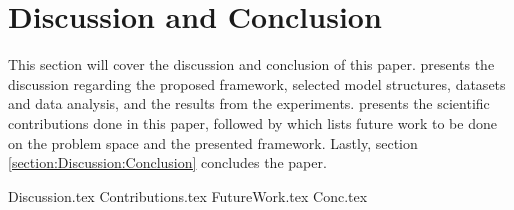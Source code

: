 \chapter{Discussion and Conclusion}

\label{section:Discussion}

This section will cover the discussion and conclusion of this paper.
 presents the discussion regarding the proposed framework,
selected model structures, datasets and data analysis, and the results from the experiments.
 presents the scientific contributions done in this paper,
followed by  which lists future work to be done on the problem space and the presented framework.
Lastly, section \ref{section:Discussion:Conclusion} concludes the paper.


{Discussion.tex}
{Contributions.tex}
{FutureWork.tex}
{Conc.tex}
